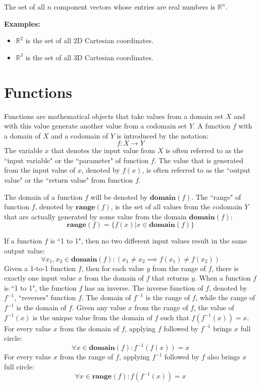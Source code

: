 \documentclass{article}
\begin{document}
The set of all \(n\) component vectors whose entries are real numbers is \(\mathbb{R}^n\). 

\textbf{Examples:}
\begin{itemize}
\item \(\mathbb{R}^2\) is the set of all 2D Cartesian coordinates.
\item \(\mathbb{R}^3\) is the set of all 3D Cartesian coordinates.
\end{itemize}



\section*{Functions}

Functions are mathematical objects that take values from a domain set \(X\) and with this value generate another value from a codomain set \(Y\). A function \(f\) with a domain of \(X\) and a codomain of \(Y\) is introduced by the notation:
\[f: X \rightarrow Y\]
The variable \(x\) that denotes the input value from \(X\) is often referred to as the ``input variable" or the ``parameter" of function \(f\). 
The value that is generated from the input value of \(x\), denoted by \(f(x)\), is often referred to as the ``output value" or the ``return value" from function \(f\).

The domain of a function \(f\) will be denoted by \(\textbf{domain}(f)\). The ``range" of function \(f\), denoted by \(\textbf{range}(f)\), is the set of all values from the codomain \(Y\) that are actually generated by some value from the domain \(\textbf{domain}(f)\):
\[\textbf{range}(f) = \{f(x) | x \in \textbf{domain}(f)\}\]    

If a function \(f\) is ``1 to 1", then no two different input values result in the same output value: 
\[\forall x_1, x_2 \in \textbf{domain}(f) : (x_1 \neq x_2 \implies f(x_1) \neq f(x_2))\]
Given a 1-to-1 function \(f\), then for each value \(y\) from the range of \(f\), there is exactly one input value \(x\) from the domain of \(f\) that returns \(y\). When a function \(f\) is ``1 to 1", the function \(f\) has an inverse. The inverse function of \(f\), denoted by \(f^{-1}\), ``reverses" function \(f\). The domain of \(f^{-1}\) is the range of \(f\), while the range of \(f^{-1}\) is the domain of \(f\). Given any value \(x\) from the range of \(f\), the value of \(f^{-1}(x)\) is the unique value from the domain of \(f\) such that \(f(f^{-1}(x)) = x\). For every value \(x\) from the domain of \(f\), applying \(f\) followed by \(f^{-1}\) brings \(x\) full circle: 
\[\forall x \in \textbf{domain}(f) : f^{-1}(f(x)) = x\]
For every value \(x\) from the range of \(f\), applying \(f^{-1}\) followed by \(f\) also brings \(x\) full circle:
\[\forall x \in \textbf{range}(f) : f(f^{-1}(x)) = x\] 
\end{document}
